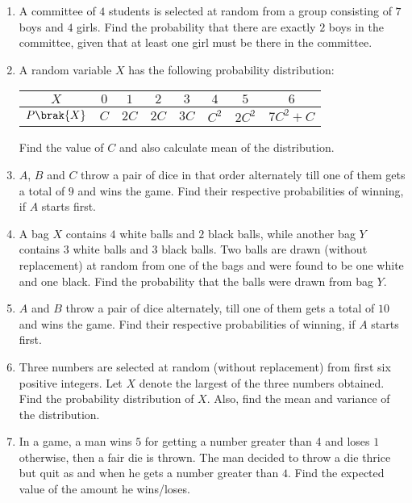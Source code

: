 \begin{enumerate}
    \item A committee of $4$ students is selected at random from a group consisting of $7$ boys and $4$ girls. Find the probability that there are exactly $2$ boys in the committee, given that at least one girl must be there in the committee.
    \item A random variable $X$ has the following probability distribution:
          \begin{center}
              \begin{tabular}{|c|c|c|c|c|c|c|c|}
                  \hline
                  $X$         & $0$ & $1$  & $2$  & $3$  & $4$   & $5$    & $6$      \\
                  \hline
                  $P\brak{X}$ & $C$ & $2C$ & $2C$ & $3C$ & $C^2$ & $2C^2$ & $7C^2+C$ \\
                  \hline
              \end{tabular}
          \end{center}
          Find the value of $C$ and also calculate mean of the distribution.
    \item $A$, $B$ and $C$ throw a pair of dice in that order alternately till one of them gets a total of $9$ and wins the game. Find their respective probabilities of winning, if $A$ starts first.

    \item A bag $X$ contains $4$ white balls and $2$ black balls, while another bag $Y$ contains $3$ white balls and $3$ black balls. Two balls are drawn (without replacement) at random from one of the bags and were found to be one white and one black. Find the probability that the balls were drawn from bag $Y$.

    \item $A$ and $B$ throw a pair of dice alternately, till one of them gets a total of $10$ and wins the game. Find their respective probabilities of winning, if $A$ starts first.

    \item Three numbers are selected at random (without replacement) from first six positive integers. Let $X$ denote the largest of the three numbers obtained. Find the probability distribution of $X$. Also, find the mean and variance of the distribution.
    \item In a game, a man wins \rupee $5$ for getting a number greater than 4 and loses \rupee $1$ otherwise, then a fair die is thrown. The man decided to throw a die thrice but  quit as and when he gets a number greater than $4$. Find the expected value of the amount he wins/loses.


\end{enumerate}
